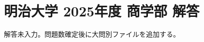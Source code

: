 \documentclass[../../uem_mei_a.tex]{subfiles}
\begin{document}
    \section{明治大学 2025年度 商学部 解答}

    解答未入力。問題数確定後に大問別ファイルを追加する。
\end{document}
